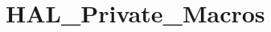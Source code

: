 \hypertarget{group___h_a_l___private___macros}{}\section{H\+A\+L\+\_\+\+Private\+\_\+\+Macros}
\label{group___h_a_l___private___macros}
